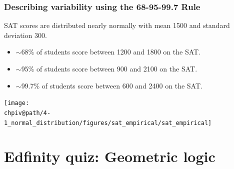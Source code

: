 \documentclass[slidestop,compress,mathserif]{beamer}
\makeatletter
\def\chpiv@path{../../Chp 4}
\makeatother
\begin{document}

\begin{frame}
\frametitle{Describing variability using the 68-95-99.7 Rule}

SAT scores are distributed nearly normally with mean 1500 and standard deviation 300.

\pause
\begin{itemize}

\item $\sim$68\% of students score between 1200 and 1800 on the SAT. 

\item $\sim$95\% of students score between 900 and 2100 on the SAT. 

\item $\sim$99.7\% of students score between 600 and 2400 on the SAT. 

\end{itemize}

\begin{center}
\texttt{[image: \\chpiv@path/4-1\_normal\_distribution/figures/sat\_empirical/sat\_empirical]}
\end{center}

\end{frame}


\section{Edfinity quiz: Geometric logic}  

\end{document}
